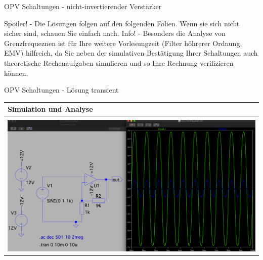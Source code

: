 \begin{frame}[t]{OPV Schaltungen - nicht-invertierender Verstärker}
\begin{spacing}{0.6}
\begin{tiny}
\begin{table}[h!]
      \end{table}

      Spoiler! - Die Lösungen folgen auf den folgenden Folien. Wenn sie sich nicht sicher sind, schauen Sie einfach nach.\newline\newline
      Info! - Besonders die Analyse von Grenzfrequeznen ist für Ihre weitere Vorlesungzeit (Filter höhrerer Ordnung, EMV) hilfreich,
      da Sie neben der simulativen Bestätigung Ihrer Schaltungen auch theoretische Rechenaufgaben simulieren und so Ihre Rechnung
      verifizieren können.

    \end{tiny} \end{spacing}
\end{frame}

\begin{frame}[t]{OPV Schaltungen - Lösung transient}

  \begin{spacing}{0.9} \begin{tiny}
      \begin{table}[h!]
        \begin{tabular}{p{10cm}}
          \hline
          \textbf{Simulation und Analyse} \\
          \hline                          \\
          \begin{minipage}{\textwidth}
            \includegraphics[width=\linewidth]{pictures/analysis_7.png}
          \end{minipage}
          \\
        \end{tabular}

      \end{table}

    \end{tiny} \end{spacing}

\end{frame}

